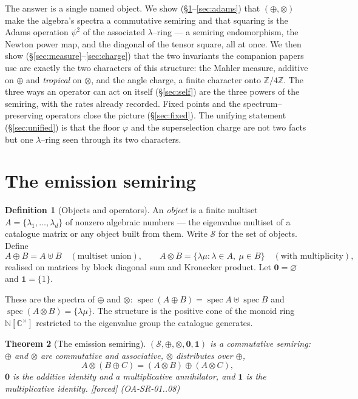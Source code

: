 \documentclass[11pt]{article}
\newcommand{\stag}[1]{{\small\textsf{\textcolor{tagcol}{[#1]}}}}
\newcommand{\bk}[1]{{\small\textsf{(#1)}}}
\theoremstyle{plain}
\newtheorem{theorem}{Theorem}[section]
\theoremstyle{definition}
\newtheorem{definition}[theorem]{Definition}
\newcommand{\Sring}{\mathcal{S}}
\newcommand{\C}{\mathbb{C}}
\newcommand{\Z}{\mathbb{Z}}
\newcommand{\N}{\mathbb{N}}
\newcommand{\psitwo}{\psi^{2}}
\newcommand{\dsum}{\oplus}
\newcommand{\dten}{\otimes}
\DeclareMathOperator{\spec}{spec}
\begin{document}
The answer is a single named object. We show (\S\ref{sec:semiring}--\ref{sec:adams}) that $(\dsum,\dten)$ make the algebra's spectra a commutative semiring and that squaring is the Adams operation $\psitwo$ of the associated $\lambda$--ring --- a semiring endomorphism, the Newton power map, and the diagonal of the tensor square, all at once. We then show (\S\ref{sec:measure}--\ref{sec:charge}) that the two invariants the companion papers use are exactly the two characters of this structure: the Mahler measure, additive on $\dsum$ and \emph{tropical} on $\dten$, and the angle charge, a finite character onto $\Z/4\Z$. The three ways an operator can act on itself (\S\ref{sec:self}) are the three powers of the semiring, with the rates already recorded. Fixed points and the spectrum--preserving operators close the picture (\S\ref{sec:fixed}). The unifying statement (\S\ref{sec:unified}) is that the floor $\varphi$ and the superselection charge are not two facts but one $\lambda$--ring seen through its two characters.

\section{The emission semiring}\label{sec:semiring}

\begin{definition}[Objects and operators]\label{def:objects}
An \emph{object} is a finite multiset $A=\{\lambda_1,\dots,\lambda_d\}$ of nonzero algebraic numbers --- the eigenvalue multiset of a catalogue matrix or any object built from them. Write $\Sring$ for the set of objects. Define
\[
A\dsum B = A\uplus B \quad(\text{multiset union}),\qquad
A\dten B = \{\lambda\mu : \lambda\in A,\ \mu\in B\}\quad(\text{with multiplicity}),
\]
realised on matrices by block diagonal sum and Kronecker product. Let $\mathbf 0=\varnothing$ and $\mathbf 1=\{1\}$.
\end{definition}

These are the spectra of $\dsum$ and $\dten$: $\spec(A\dsum B)=\spec A\uplus\spec B$ and $\spec(A\dten B)=\{\lambda\mu\}$. The structure is the positive cone of the monoid ring $\N[\C^\times]$ restricted to the eigenvalue group the catalogue generates.

\begin{theorem}[The emission semiring]\label{thm:semiring}
$(\Sring,\dsum,\dten,\mathbf 0,\mathbf 1)$ is a commutative semiring: $\dsum$ and $\dten$ are commutative and associative, $\dten$ distributes over $\dsum$,
\[
A\dten(B\dsum C)=(A\dten B)\dsum(A\dten C),
\]
$\mathbf 0$ is the additive identity and a multiplicative annihilator, and $\mathbf 1$ is the multiplicative identity. \stag{forced} \bk{OA-SR-01..08}
\end{theorem}
\end{document}
